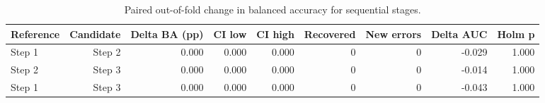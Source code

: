 \begin{table}[t]
\centering
\caption{Paired out-of-fold change in balanced accuracy for sequential stages.}
\label{tab:paired_stage_changes}
\footnotesize
\setlength{\tabcolsep}{4pt}
\begin{tabular}{lrrrrrrrr}
\toprule
Reference & Candidate & Delta BA (pp) & CI low & CI high & Recovered & New errors & Delta AUC & Holm p \\
\midrule
Step 1 & Step 2 & 0.000 & 0.000 & 0.000 & 0 & 0 & -0.029 & 1.000 \\
Step 2 & Step 3 & 0.000 & 0.000 & 0.000 & 0 & 0 & -0.014 & 1.000 \\
Step 1 & Step 3 & 0.000 & 0.000 & 0.000 & 0 & 0 & -0.043 & 1.000 \\
\bottomrule
\end{tabular}
\end{table}
